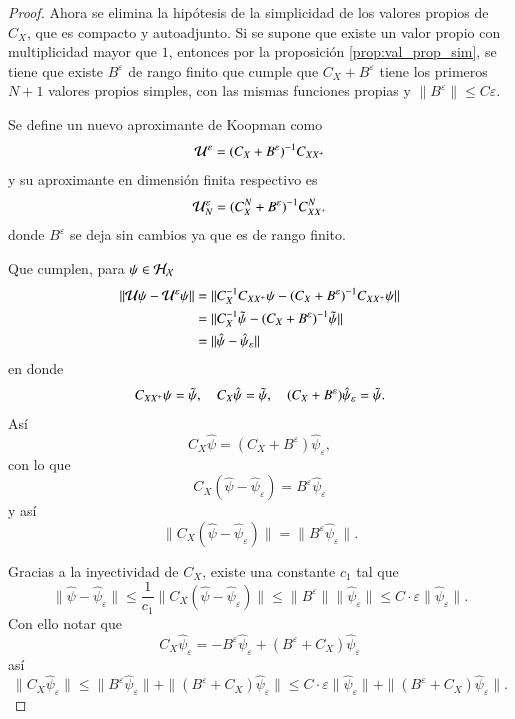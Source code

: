 \begin{proof}
    Ahora se elimina la hipótesis de la simplicidad de los valores propios de $C_X$, que es compacto y autoadjunto. Si se supone que existe un valor propio con multiplicidad mayor que $1$, entonces por la proposición \ref{prop:val_prop_sim}, se tiene que existe $B^\varepsilon$ de rango finito que cumple que $C_X + B^\varepsilon$ tiene los primeros $N+1$ valores propios simples, con las mismas funciones propias y $\| B^\varepsilon \| \leq C \varepsilon$. 

    Se define un nuevo aproximante de Koopman como
    \[
    \mathcal{U}^\varepsilon = (C_X + B^\varepsilon)^{-1} C_{XX^+}
    \]
    y su aproximante en dimensión finita respectivo es
    \[
    \mathcal{U}^\varepsilon_N = (C_X^N + B^\varepsilon)^{-1} C_{XX^+}^N
    \]
    donde $B^\varepsilon$ se deja sin cambios ya que es de rango finito.

    Que cumplen, para $\psi \in \mathcal{H}_{\mathcal{X}}$
    \[
    \begin{aligned}
        \| \mathcal{U}\psi - \mathcal{U}^\varepsilon\psi \| & = \| C_X^{-1} C_{XX^+} \psi - (C_X + B^\varepsilon)^{-1} C_{XX^+} \psi \| \\
        & = \| C_X^{-1} \Tilde{\psi} - (C_X + B^\varepsilon)^{-1} \Tilde{\psi} \| \\
        & = \| \hat{\psi} - \hat{\psi}_\varepsilon \|
    \end{aligned} 
    \]
    en donde
    \[
    C_{XX^+}\psi = \Tilde{\psi}, \quad C_X \hat{\psi} =  \Tilde{\psi}, \quad (C_X + B^\varepsilon)\hat{\psi}_\varepsilon = \Tilde{\psi}.
    \]
    Así
    \[
    C_X \hat{\psi} = (C_X + B^\varepsilon)\hat{\psi}_\varepsilon,
    \]
    con lo que
    \[
    C_X (\hat{\psi} - \hat{\psi}_\varepsilon) = B^\varepsilon \hat{\psi}_\varepsilon
    \]
    y así
    \[
    \|C_X (\hat{\psi} - \hat{\psi}_\varepsilon)\| = \|B^\varepsilon \hat{\psi}_\varepsilon\|.
    \]

    Gracias a la inyectividad de $C_X$, existe una constante $c_1$ tal que 
    \[
    \| \hat{\psi} - \hat{\psi}_\varepsilon \| \leq \frac{1}{c_1} \| C_X (\hat{\psi} - \hat{\psi}_\varepsilon) \| \leq \| B^\varepsilon \| \| \hat{\psi}_\varepsilon \| \leq C \cdot \varepsilon \| \hat{\psi}_\varepsilon \|. 
    \]
    Con ello notar que
    \[
    C_X \hat{\psi}_\varepsilon  = -B^\varepsilon \hat{\psi}_\varepsilon  + (B^\varepsilon + C_X)\hat{\psi}_\varepsilon
    \]
    así
    \[
    \| C_X \hat{\psi}_\varepsilon \| \leq \| B^\varepsilon \hat{\psi}_\varepsilon \| + \| (B^\varepsilon + C_X)\hat{\psi}_\varepsilon\| \leq C \cdot \varepsilon  \| \hat{\psi}_\varepsilon \| + \| (B^\varepsilon + C_X)\hat{\psi}_\varepsilon\|. 
    \]
    

\end{proof}
